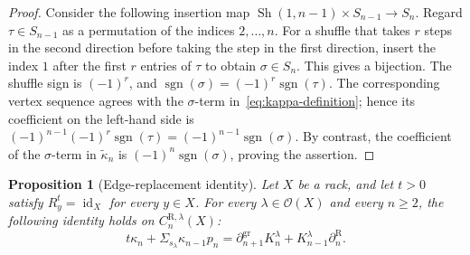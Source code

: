 \documentclass[10pt,a4paper]{amsart}
\newtheorem{proposition}[theorem]{Proposition}
\DeclareMathOperator{\sgn}{sgn}
\newcommand{\OO}{\mathcal O}
\newcommand{\tkap}{\widetilde\kappa}
\newcommand{\gr}{\mathrm{gr}}
\newcommand{\R}{\mathrm R}
\begin{document}
\begin{proof}
Consider the following insertion map $\operatorname{Sh}(1,n-1)\times S_{n-1}\to S_n$. Regard $\tau\in S_{n-1}$ as a permutation of the indices $2,\ldots,n$. For a shuffle that takes $r$ steps in the second direction before taking the step in the first direction, insert the index $1$ after the first $r$ entries of $\tau$ to obtain $\sigma\in S_n$. This gives a bijection. The shuffle sign is $(-1)^r$, and $\sgn(\sigma)=(-1)^r\sgn(\tau)$. The corresponding vertex sequence agrees with the $\sigma$-term in~\eqref{eq:kappa-definition}; hence its coefficient on the left-hand side is
$(-1)^{n-1}(-1)^r\sgn(\tau)=(-1)^{n-1}\sgn(\sigma)$. By contrast, the coefficient of the $\sigma$-term in $\tkap_n$ is $(-1)^n\sgn(\sigma)$, proving the assertion.
\end{proof}

\begin{proposition}[Edge-replacement identity]
\label{prop:edge-replacement}
Let $X$ be a rack, and let $t>0$ satisfy $R_y^t=\operatorname{id}_X$ for every $y\in X$. For every $\lambda\in\OO(X)$ and every $n\ge2$, the following identity holds on $C_n^{\R,\lambda}(X)$:
\begin{equation}
        t\kappa_n+
        \Sigma_{s_\lambda}\kappa_{n-1}p_n
        =
        \partial_{n+1}^{\gr}K_n^\lambda
        +K_{n-1}^\lambda\partial_n^\R.
\label{eq:edge-replacement}
\end{equation}
\end{proposition}
\end{document}

